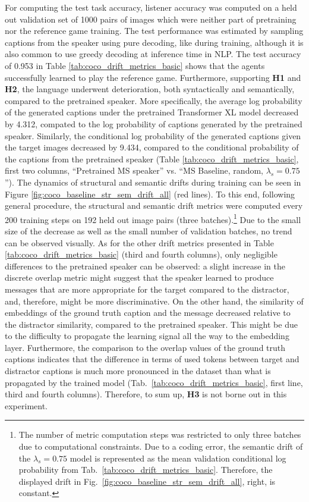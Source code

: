 For computing the test task accuracy, listener accuracy was computed on a held out validation set of 1000 pairs of images which were neither part of pretraining nor the reference game training. The test performance was estimated by sampling captions from the speaker using pure decoding, like during training, although it is also common to use greedy decoding at inference time in NLP. The test accuracy of 0.953 in Table \ref{tab:coco_drift_metrics_basic} shows that the agents successfully learned to play the reference game. Furthermore, supporting \textbf{H1} and \textbf{H2}, the language underwent deterioration, both syntactically and semantically, compared to the pretrained speaker. More specifically, the average log probability of the generated captions under the pretrained Transformer XL model decreased by 4.312, compated to the log probability of captions generated by the pretrained speaker. Similarly, the conditional log probability of the generated captions given the target images decreased by 9.434, compared to the conditional probability of the captions from the pretrained speaker (Table \ref{tab:coco_drift_metrics_basic}, first two columns, ``Pretrained MS speaker'' vs. ``MS Baseline, random, $\lambda_s=0.75$''). The dynamics of structural and semantic drifts during training can be seen in Figure \ref{fig:coco_baseline_str_sem_drift_all} (red lines). To this end, following general procedure, the structural and semantic drift metrics were computed every 200 training steps on 192 held out image pairs (three batches).\footnote{The number of metric computation steps was restricted to only three batches due to computational constraints. Due to a coding error, the semantic drift of the $\lambda_s = 0.75$ model is represented as the mean validation conditional log probability from Tab.~\ref{tab:coco_drift_metrics_basic}. Therefore, the displayed drift in Fig.~\ref{fig:coco_baseline_str_sem_drift_all}, right, is constant.} Due to the small size of the decrease as well as the small number of validation batches, no trend can be observed visually.
As for the other drift metrics presented in Table \ref{tab:coco_drift_metrics_basic} (third and fourth columns), only negligible differences to the pretrained speaker can be observed: a slight increase in the discrete overlap metric might suggest that the speaker learned to produce messages that are more appropriate for the target compared to the distractor, and, therefore, might be more discriminative. On the other hand, the similarity of embeddings of the ground truth caption and the message decreased relative to the distractor similarity, compared to the pretrained speaker. This might be due to the difficulty to propagate the learning signal all the way to the embedding layer. Furthermore, the comparison to the overlap values of the ground truth captions indicates that the difference in terms of used tokens between target and distractor captions is much more pronounced in the dataset than what is propagated by the trained model (Tab.~\ref{tab:coco_drift_metrics_basic}, first line, third and fourth columns).  
Therefore, to sum up, \textbf{H3} is not borne out in this experiment.

